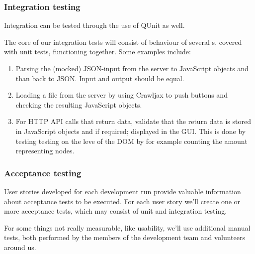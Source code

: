 \subsubsection{Integration testing}
Integration can be tested through the use of QUnit as well.

The core of our integration tests will consist of behaviour of several s, covered with unit tests, functioning together. Some examples include:
\begin{enumerate}
\item Parsing the (mocked) JSON-input from the server to JavaScript objects and than back to JSON. Input and output should be equal.
\item Loading a file from the server by using Crawljax to push buttons and checking the resulting JavaScript objects.
\item For HTTP API calls that return data, validate that the return data is stored in JavaScript objects and if required; displayed in the GUI. This is done by testing testing on the leve of the DOM by for example counting the amount representing nodes.\end{enumerate}

\subsubsection{Acceptance testing}
User stories developed for each development run provide valuable information about acceptance tests to be executed. For each user story we'll create one or more acceptance tests, which may consist of unit and integration testing.

For some things not really measurable, like usability, we'll use additional manual tests, both performed by the members of the development team and volunteers around us.
